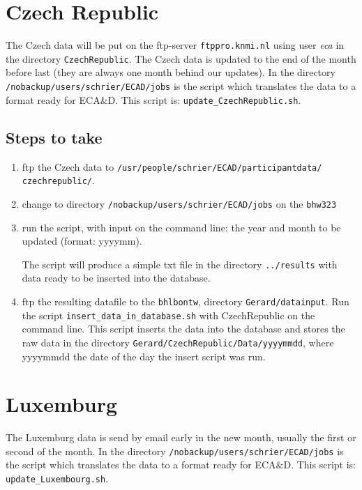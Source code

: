 \documentclass[a4paper]{article}
\begin{document}

\section{Czech Republic}

The Czech data will be put on the ftp-server \texttt{ftppro.knmi.nl}
using user \textit{eca} in the directory \texttt{CzechRepublic}. 
The Czech data is updated to the end of the month before last (they are always one
month behind our updates). 
In the directory
\texttt{/nobackup/users/schrier/ECAD/jobs} is the script which translates the data to
a  format ready for ECA\&D.
This script is: \texttt{update\_CzechRepublic.sh}.

\subsection*{Steps to take}

\begin{enumerate}
\item ftp the Czech data to \texttt{/usr/people/schrier/ECAD/participantdata/} \texttt{czechrepublic/}.
\item change to directory \texttt{/nobackup/users/schrier/ECAD/jobs} on the \texttt{bhw323}
\item run the script, with input on the command line: the year and month to be updated (format: yyyymm).

The script will produce a simple txt file in the directory \texttt{../results} 
with data ready to be inserted into the database.
\item ftp the resulting datafile to the \texttt{bhlbontw},
directory \texttt{Gerard/datainput}. Run the script \texttt{insert\_data\_in\_database.sh} with CzechRepublic
on the command line. This script inserts the data into the database and stores the raw
data in the directory \texttt{Gerard/CzechRepublic/Data/yyyymmdd}, where yyyymmdd the date of the day the insert
script was run.
\end{enumerate}



\section{Luxemburg}

The Luxemburg data is send by email early in the new month, usually the first or second of the month.
In the directory
\texttt{/nobackup/users/schrier/ECAD/jobs} is the script which translates the data to
a  format ready for ECA\&D.
This script is: \texttt{update\_Luxembourg.sh}.
\end{document}
